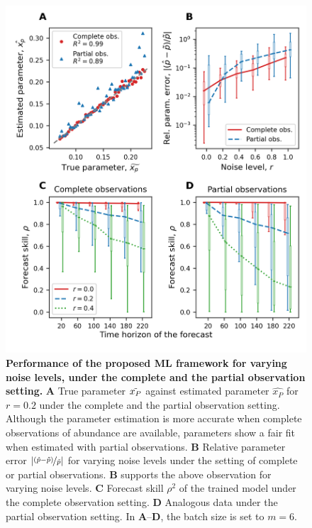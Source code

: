 \begin{figure}[ht]
    \centering
    \includegraphics[]{figures/figure3.png}
    \caption{\textbf{Performance of the proposed ML framework for varying noise levels, under the complete and the partial observation setting.} 
    \textbf{A} True parameter $\Tilde{x_P}$ against estimated parameter $\hat{x_P}$ for $r = 0.2$ under the complete and the partial observation setting. Although the parameter estimation is more accurate when complete observations of abundance are available, parameters show a fair fit when estimated with partial observations. 
    \textbf{B} Relative parameter error $|\nicefrac{(\hat p -\Tilde{p})}{\Tilde{p}}|$ for varying noise levels under the setting of complete or partial observations. \textbf{B} supports the above observation for varying noise levels.
    \textbf{C} Forecast skill $\rho^2$ of the trained model under the complete observation setting.
    \textbf{D} Analogous data under the partial observation setting.
    In \textbf{A}--\textbf{D}, the batch size is set to $m = 6$.}
    \label{fig:perfect_setting_noise}
\end{figure}
\FloatBarrier

